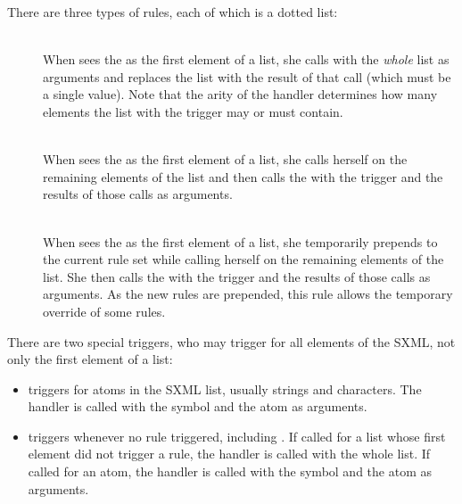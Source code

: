 There are three types of rules, each of which is a dotted list:
\begin{description}
\item[] \mbox{}\\
When  sees the  as the
first element of a list, she calls  with the
\emph{whole} list as arguments and replaces the list with the result
of that call (which must be a single value).  Note that the arity of
the handler determines how many elements the list with the trigger may
or must contain.

\item[] \mbox{}\\
When  sees the  as the first
element of a list, she calls herself on the remaining elements of the
list and then calls the  with the trigger and the
results of those calls as arguments.

\item[] \mbox{} \\
When  sees the  as the first
element of a list, she temporarily prepends  to the
current rule set while calling herself on the remaining elements of
the list.  She then calls the  with the trigger and
the results of those calls as arguments.  As the new rules are
prepended, this rule allows the temporary override of some rules.
\end{description}

There are two special triggers, who may trigger for all elements of
the SXML, not only the first element of a list:
\begin{itemize}
\item  {} triggers for atoms in the SXML list, \ie usually
strings and characters.  The handler is called with the symbol
 and the atom as arguments.

\item {} triggers whenever no rule triggered, including
.  If called for a list whose first element did not trigger
a rule, the handler is called with the whole list.  If called for an
atom, the handler is called with the symbol  and the atom
as arguments.
\end{itemize}

